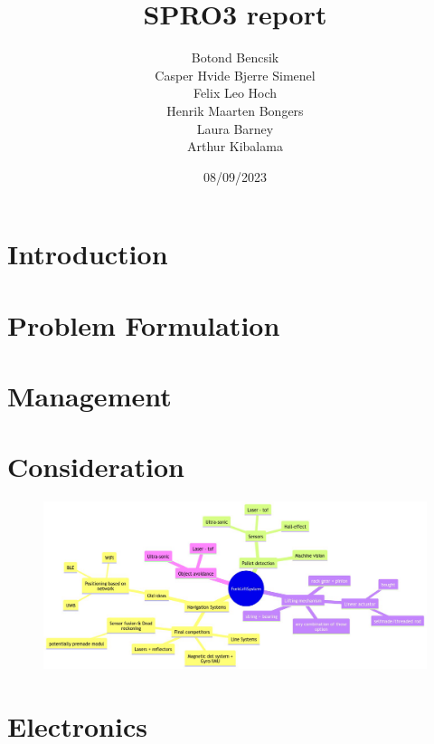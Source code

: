 \documentclass[11pt]{article}
\title{SPRO3 report}
\date{08/09/2023}
\author{Botond Bencsik\\Casper Hvide Bjerre Simenel\\Felix Leo Hoch\\Henrik Maarten Bongers\\Laura Barney\\Arthur Kibalama}
\begin{document}
\maketitle
 
\tableofcontents
\newpage
\section{Introduction}
      
\section{Problem Formulation}
    
    

    
\section{Management}
    
    
\section{Consideration}
\begin{figure}[H]
    \centering
    \includegraphics[width=0.8\linewidth]{MindmapForkliftSystemSolutions.md.1.png}
\end{figure}   


    
\section{Electronics}
    
    
\end{document}
